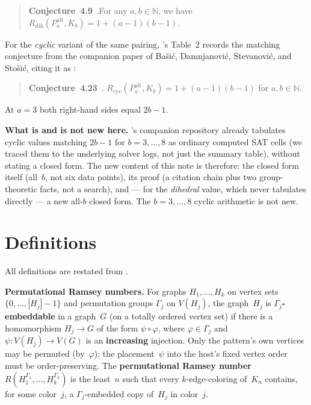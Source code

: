 \documentclass[11pt]{article}
\theoremstyle{definition}
\newcommand{\Rdih}{R_{\mathrm{dih}}}
\newcommand{\Rcyc}{R_{\mathrm{cyc}}}
\begin{document}
\begin{quote}
\textbf{Conjecture~4.9}~\cite{DD26}.\quad For any $a, b \in \mathbb{N}$, we have
$\Rdih(P_a^{\mathrm{alt}}, K_b) = 1 + (a-1)(b-1)$.
\end{quote}

For the \emph{cyclic} variant of the same pairing, \cite{DD26}'s Table~2 records
the matching conjecture from the companion paper of Ba\v{s}i\'c, Damnjanovi\'c,
Stevanovi\'c, and Sto\v{s}i\'c, citing it as \cite[Conjecture~4.23]{Bas26}:

\begin{quote}
\textbf{Conjecture~4.23}~\cite{Bas26}.\quad
$\Rcyc(P_a^{\mathrm{alt}}, K_b) = 1 + (a-1)(b-1)$ for $a, b \in \mathbb{N}$.
\end{quote}

At $a=3$ both right-hand sides equal $2b-1$.

\medskip\noindent\textbf{What is and is not new here.}\quad
\cite{Bas26}'s companion repository already tabulates cyclic values matching
$2b-1$ for $b = 3,\ldots,8$ as ordinary computed SAT cells (we traced them to the
underlying solver logs, not just the summary table), without stating a closed form.
The new content of this note is therefore: the closed form itself (all~$b$, not six
data points), its proof (a citation chain plus two group-theoretic facts, not a
search), and --- for the \emph{dihedral} value, which \cite{Bas26} never tabulates
directly --- a new all-$b$ closed form. The $b = 3,\ldots,8$ cyclic arithmetic is
not new.

\section{Definitions}

All definitions are restated from \cite[\S\S1--2]{DD26}.

\medskip\noindent\textbf{Permutational Ramsey numbers.}\quad
For graphs $H_1, \ldots, H_k$ on vertex sets $\{0, \ldots, |H_j|-1\}$ and
permutation groups $\Gamma_j$ on $V(H_j)$, the graph~$H_j$ is
\textbf{$\Gamma_j$-embeddable} in a graph~$G$ (on a totally ordered vertex set)
if there is a homomorphism $H_j \to G$ of the form $\psi \circ \varphi$, where
$\varphi \in \Gamma_j$ and $\psi: V(H_j) \to V(G)$ is an \textbf{increasing}
injection. Only the pattern's own vertices may be permuted (by~$\varphi$); the
placement~$\psi$ into the host's fixed vertex order must be order-preserving. The
\textbf{permutational Ramsey number} $R(H_1^{\Gamma_1}, \ldots, H_k^{\Gamma_k})$
is the least~$n$ such that every $k$-edge-coloring of~$K_n$ contains, for some
color~$j$, a $\Gamma_j$-embedded copy of~$H_j$ in color~$j$.
\end{document}
